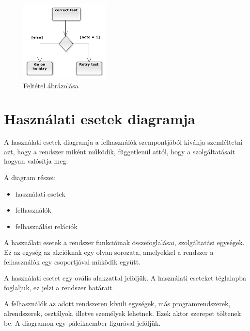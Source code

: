 \documentclass[margin=0px]{article}
\begin{document}
			\begin{figure}[H]
				\centering
				\includegraphics[width=0.4\textwidth]{img/tevekenyseg2.png}
				\caption{Feltétel ábrázolása}
			\end{figure}
	\section{Használati esetek diagramja}
		A használati esetek diagramja a felhasználók szempontjából kívánja
		szemléltetni azt, hogy a rendszer miként működik, függetlenül attól,
		hogy a szolgáltatásait hogyan valósítja meg.
		
		\noindent
		A diagram részei:
		\begin{itemize}
			\item használati esetek
			\item felhasználók
			\item felhasználási relációk
		\end{itemize}
		
		A használati esetek a rendszer funkcióinak összefoglalásai, szolgáltatási
		egységek. Ez az egység az akcióknak egy olyan sorozata, amelyekkel
		a rendszer a felhasználók egy csoportjával működik együtt.
		
		A használati esetet egy ovális alakzattal jelöljük. A használati eseteket téglalapba foglaljuk, ez jelzi a rendszer határait.
		
		A felhasználók az adott rendszeren kívüli egységek, más programrendszerek,
		alrendszerek, osztályok, illetve személyek lehetnek. Ezek
		aktor szerepet töltenek be. A diagramon egy pálcikaember figurával jelöljük.
		
\end{document}
